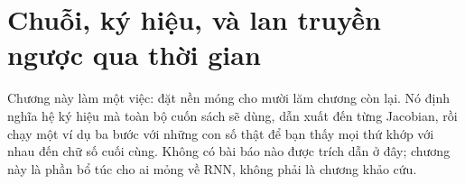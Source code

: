 \chapter{Chuỗi, ký hiệu, và lan truyền ngược qua thời gian}
\label{ch:ky-hieu-va-bptt}

Chương này làm một việc: đặt nền móng cho mười lăm chương còn lại. Nó định
nghĩa hệ ký hiệu mà toàn bộ cuốn sách sẽ dùng, dẫn xuất
 đến từng
Jacobian, rồi chạy một ví dụ ba bước với những con số thật
để bạn thấy mọi thứ khớp với nhau đến chữ số cuối cùng. Không có bài báo nào
được trích dẫn ở đây; chương này là phần bổ túc cho ai mỏng về RNN, không
phải là chương khảo cứu.









